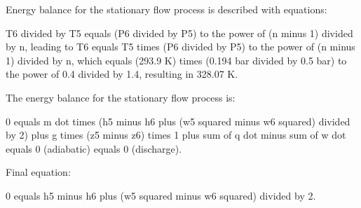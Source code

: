 Energy balance for the stationary flow process is described with equations:

T6 divided by T5 equals (P6 divided by P5) to the power of (n minus 1) divided by n, leading to T6 equals T5 times (P6 divided by P5) to the power of (n minus 1) divided by n, which equals (293.9 K) times (0.194 bar divided by 0.5 bar) to the power of 0.4 divided by 1.4, resulting in 328.07 K.

The energy balance for the stationary flow process is:

0 equals m dot times (h5 minus h6 plus (w5 squared minus w6 squared) divided by 2) plus g times (z5 minus z6) times 1 plus sum of q dot minus sum of w dot equals 0 (adiabatic) equals 0 (discharge).

Final equation:

0 equals h5 minus h6 plus (w5 squared minus w6 squared) divided by 2.